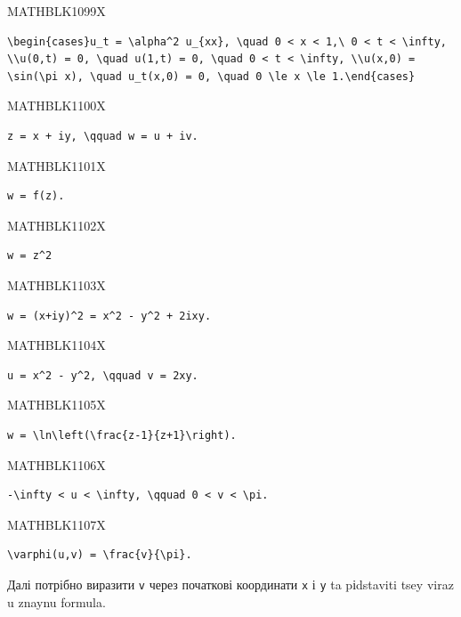 \documentclass[
  ukrainian,
]{article}
\begin{document}
MATHBLK1099X

\begin{verbatim}
\begin{cases}u_t = \alpha^2 u_{xx}, \quad 0 < x < 1,\ 0 < t < \infty, \\u(0,t) = 0, \quad u(1,t) = 0, \quad 0 < t < \infty, \\u(x,0) = \sin(\pi x), \quad u_t(x,0) = 0, \quad 0 \le x \le 1.\end{cases}
\end{verbatim}

MATHBLK1100X

\begin{verbatim}
z = x + iy, \qquad w = u + iv.
\end{verbatim}

MATHBLK1101X

\begin{verbatim}
w = f(z).
\end{verbatim}

MATHBLK1102X

\begin{verbatim}
w = z^2
\end{verbatim}

MATHBLK1103X

\begin{verbatim}
w = (x+iy)^2 = x^2 - y^2 + 2ixy.
\end{verbatim}

MATHBLK1104X

\begin{verbatim}
u = x^2 - y^2, \qquad v = 2xy.
\end{verbatim}

MATHBLK1105X

\begin{verbatim}
w = \ln\left(\frac{z-1}{z+1}\right).
\end{verbatim}

MATHBLK1106X

\begin{verbatim}
-\infty < u < \infty, \qquad 0 < v < \pi.
\end{verbatim}

MATHBLK1107X

\begin{verbatim}
\varphi(u,v) = \frac{v}{\pi}.
\end{verbatim}

Далі потрібно виразити \texttt{v} через початкові координати \texttt{x}
і \texttt{y} ta pіdstaviti tsey viraz u znaynu formula.
\end{document}
